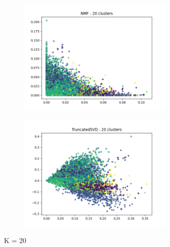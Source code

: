 \documentclass[11pt]{article}
\begin{document}
\begin{appendices}
\begin{figure}[H]
\centering
\begin{subfigure}{\textwidth}
  \centering
  \includegraphics[width=3in]{images/nmf_20.png}
  \label{fig:nmf20}
\end{subfigure}%
\begin{subfigure}{\textwidth}
  \centering
  \includegraphics[width=3in]{images/svd_20.png}
  \label{fig:svd20}
\end{subfigure}
\caption{K = 20}
\label{fig:k20}
\end{figure}


\end{appendices}
\end{document}
